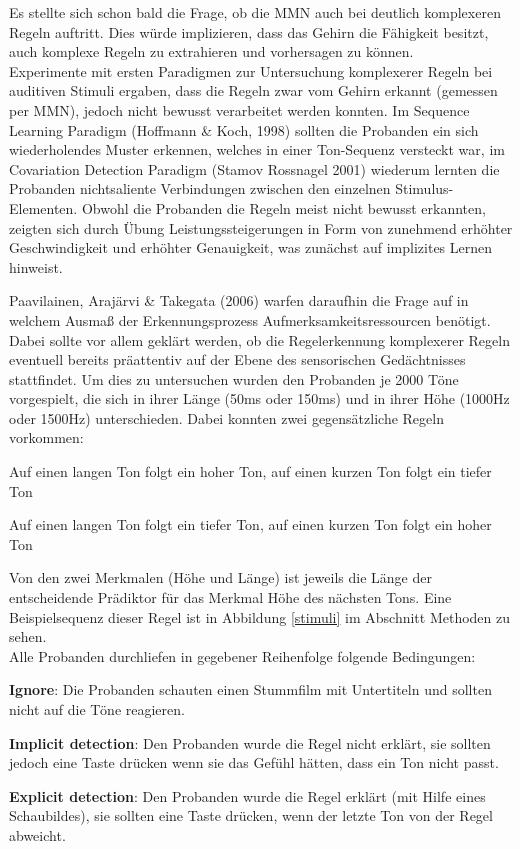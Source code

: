 \documentclass[doc,a4paper,12pt]{apa6}
\begin{document}
Es stellte sich schon bald die Frage, ob die MMN auch bei deutlich komplexeren Regeln auftritt. Dies würde implizieren, dass das Gehirn die Fähigkeit besitzt, auch komplexe Regeln zu extrahieren und vorhersagen zu können.\\
Experimente mit ersten Paradigmen zur Untersuchung komplexerer Regeln bei auditiven Stimuli ergaben, dass die Regeln zwar vom Gehirn erkannt (gemessen per MMN), jedoch nicht bewusst verarbeitet werden konnten. Im Sequence Learning Paradigm (Hoffmann \& Koch, 1998) sollten die Probanden ein sich wiederholendes Muster erkennen, welches in einer Ton-Sequenz versteckt war, im Covariation Detection Paradigm (Stamov Rossnagel 2001) wiederum lernten die Probanden nichtsaliente Verbindungen zwischen den einzelnen Stimulus-Elementen. Obwohl die Probanden die Regeln meist nicht bewusst erkannten, zeigten sich durch Übung Leistungssteigerungen in Form von zunehmend erhöhter Geschwindigkeit und erhöhter Genauigkeit, was zunächst auf implizites Lernen hinweist.

Paavilainen, Arajärvi \& Takegata (2006) warfen daraufhin die Frage auf in welchem Ausmaß der Erkennungsprozess Aufmerksamkeitsressourcen benötigt. Dabei sollte vor allem geklärt werden, ob die Regelerkennung komplexerer Regeln eventuell bereits präattentiv auf der Ebene des sensorischen Gedächtnisses stattfindet. Um dies zu untersuchen wurden den Probanden je 2000 Töne vorgespielt, die sich in ihrer Länge (50ms oder 150ms) und in ihrer Höhe (1000Hz oder 1500Hz) unterschieden. Dabei konnten zwei gegensätzliche Regeln vorkommen:

\begin{compactitem}
  \item Auf einen langen Ton folgt ein hoher Ton, auf einen kurzen Ton folgt ein tiefer
Ton
  \item Auf einen langen Ton folgt ein tiefer Ton, auf einen kurzen Ton folgt ein hoher
Ton
\end{compactitem}

Von den zwei Merkmalen (Höhe und Länge) ist jeweils die Länge der entscheidende Prädiktor für das Merkmal Höhe des nächsten Tons. Eine Beispielsequenz dieser Regel ist in Abbildung \ref{stimuli} im Abschnitt Methoden zu sehen.\\
Alle Probanden durchliefen in gegebener Reihenfolge folgende Bedingungen:

\begin{compactitem}
  \item \textbf{Ignore}: Die Probanden schauten einen Stummfilm mit Untertiteln und sollten nicht auf die Töne reagieren.
  \item \textbf{Implicit detection}: Den Probanden wurde die Regel nicht erklärt, sie sollten jedoch eine Taste drücken wenn sie das Gefühl hätten, dass ein Ton nicht passt.
  \item \textbf{Explicit detection}: Den Probanden wurde die Regel erklärt (mit Hilfe eines Schaubildes), sie sollten eine Taste drücken, wenn der letzte Ton von der Regel abweicht.
\end{compactitem}
\end{document}
